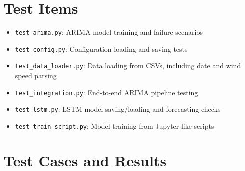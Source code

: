 \section{Test Items}
\begin{itemize}
	\item \texttt{test\_arima.py}: ARIMA model training and failure scenarios
	\item \texttt{test\_config.py}: Configuration loading and saving tests
	\item \texttt{test\_data\_loader.py}: Data loading from CSVs, including date and wind speed parsing
	\item \texttt{test\_integration.py}: End-to-end ARIMA pipeline testing
	\item \texttt{test\_lstm.py}: LSTM model saving/loading and forecasting checks
	\item \texttt{test\_train\_script.py}: Model training from Jupyter-like scripts
\end{itemize}




\section{Test Cases and Results}

